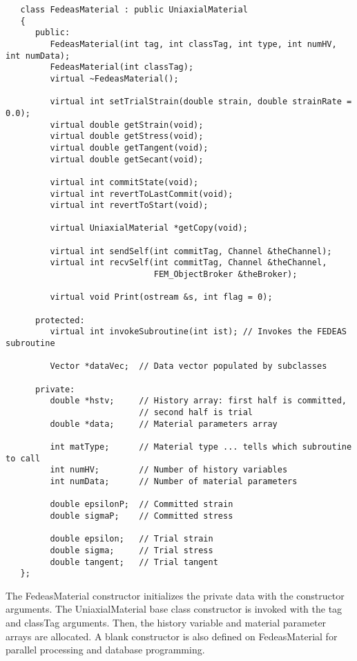 \documentclass[12pt]{article}
\begin{document}
{\sf\small
\begin{verbatim}
   class FedeasMaterial : public UniaxialMaterial
   {
      public:
         FedeasMaterial(int tag, int classTag, int type, int numHV, int numData);
         FedeasMaterial(int classTag);
         virtual ~FedeasMaterial();

         virtual int setTrialStrain(double strain, double strainRate = 0.0);
         virtual double getStrain(void);
         virtual double getStress(void);
         virtual double getTangent(void);
         virtual double getSecant(void);

         virtual int commitState(void);
         virtual int revertToLastCommit(void);    
         virtual int revertToStart(void);        

         virtual UniaxialMaterial *getCopy(void);

         virtual int sendSelf(int commitTag, Channel &theChannel);  
         virtual int recvSelf(int commitTag, Channel &theChannel, 
		                      FEM_ObjectBroker &theBroker);    
    
         virtual void Print(ostream &s, int flag = 0);

      protected:
         virtual int invokeSubroutine(int ist); // Invokes the FEDEAS subroutine

         Vector *dataVec;  // Data vector populated by subclasses

      private:
         double *hstv;     // History array: first half is committed,
                           // second half is trial
         double *data;     // Material parameters array

         int matType;      // Material type ... tells which subroutine to call
         int numHV;        // Number of history variables
         int numData;      // Number of material parameters

         double epsilonP;  // Committed strain
         double sigmaP;    // Committed stress

         double epsilon;   // Trial strain
         double sigma;     // Trial stress
         double tangent;   // Trial tangent
   };
\end{verbatim}
}

\noindent The FedeasMaterial constructor initializes the private data with the
constructor arguments. The UniaxialMaterial base class constructor is invoked with the 
tag and classTag arguments. Then, the history variable and material parameter arrays
are allocated. A blank constructor is also defined on FedeasMaterial for parallel
processing and database programming.
\end{document}
